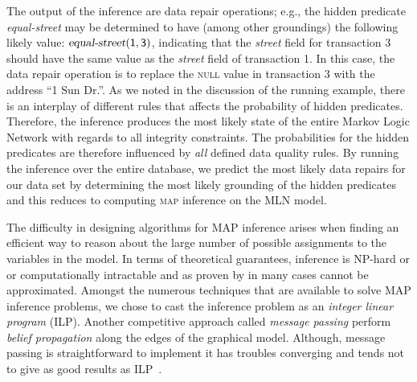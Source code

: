 The output of the inference are data repair operations; e.g., the hidden predicate \textsl{equal-street} may be determined to have (among other groundings) the following likely value: $\mathsf{\textsl{equal-street}(1, 3)}$, indicating that the \textsl{street} field for transaction 3 should have the same value as the \textsl{street} field of transaction 1. In this case, the data repair operation is to replace the \textsc{null} value in transaction 3 with the address ``1 Sun Dr.''. 
As we noted in the discussion of the running example, there is an interplay of different rules that affects the probability of hidden predicates. Therefore, the inference produces the most likely state of the entire Markov Logic Network with regards to all integrity constraints. The probabilities for the hidden predicates are therefore influenced by \textit{all} defined data quality rules. By running the inference over the entire database, we predict the most likely data repairs for our data set by determining the most likely grounding of the hidden predicates and this reduces to computing \textsc{map} inference on the MLN model.      

The difficulty in designing algorithms for MAP inference arises when finding an efficient way to reason about the large number of possible assignments to the variables in the model. In terms of theoretical guarantees, inference is NP-hard or or computationally intractable and as proven by \cite{Shimony1994} in many cases cannot be approximated. Amongst the numerous techniques that are available to solve MAP inference problems, we chose to cast the inference problem as an \emph{integer linear program} (ILP)\cite{Sontag10approximateinference}. Another competitive approach called \emph{message passing} perform \emph{belief propagation} along the edges of the graphical model. Although, message passing is straightforward to implement it has troubles converging \cite{schwing2011distributed, felzenszwalb2006efficient, pritch2009shift} and tends not to give as good results as ILP~\cite{NoessnerNS13}. 

